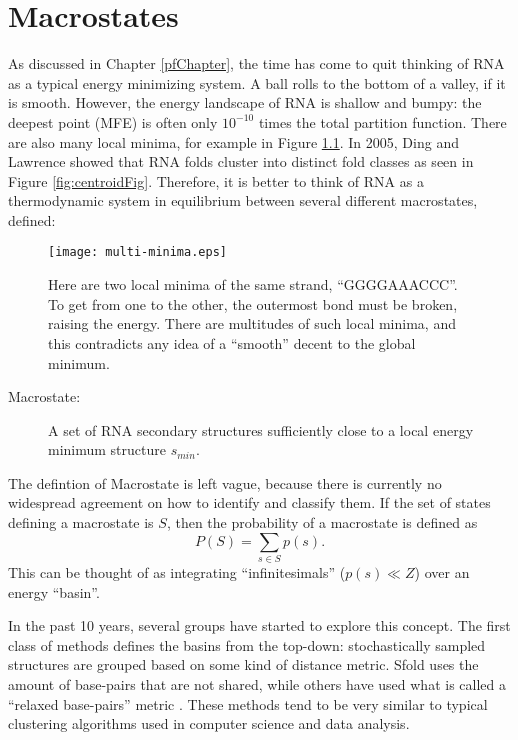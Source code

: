 \chapter{Macrostates}

As discussed in Chapter \ref{pfChapter}, the time has come to quit
thinking of RNA as a typical energy minimizing system. A ball rolls to
the bottom of a valley, if it is smooth. However, the energy landscape
of RNA is shallow and bumpy: the deepest point (MFE) is often only
$10^{-10}$ times the total partition function. There are also many
local minima, for example in Figure \ref{fig:localMinima}. In 2005,
Ding and Lawrence showed that RNA folds cluster into distinct fold
classes \cite{ding2005rna} as seen in Figure
\ref{fig:centroidFig}. Therefore, it is better to think of RNA as a
thermodynamic system in equilibrium between several different
macrostates, defined:
\begin{figure}[t]
\texttt{[image: multi-minima.eps]}
\caption[Local Minima]{Here are two local minima of the same strand,
  ``GGGGAAACCC''. To get from one to the other, the outermost bond
  must be broken, raising the energy. There are multitudes of such
  local minima, and this contradicts any idea of a ``smooth'' decent
  to the global minimum.}
\label{fig:localMinima}
\end{figure}
\begin{description}
\item[Macrostate:] A set of RNA secondary structures sufficiently close to a local energy minimum structure $s_{min}$.
\end{description}
The defintion of Macrostate is left vague, because there is currently
no widespread agreement on how to identify and classify them. If the
set of states defining a macrostate is $S$, then the probability of a
macrostate is defined as
\begin{equation} 
P(S) = \sum_{s \in S} p(s).
\end{equation}
This can be thought of as integrating ``infinitesimals'' ($p(s)\ll Z$)
over an energy ``basin''.

In the past 10 years, several groups have started to explore this
concept. The first class of methods defines the basins from the
top-down: stochastically sampled structures are grouped based on some
kind of distance metric. Sfold uses the amount of base-pairs that are
not shared, while others have used what is called a ``relaxed
base-pairs'' metric \cite{ding2005rna}
\cite{agius2010comparing}. These methods tend to be very similar to
typical clustering algorithms used in computer science and data
analysis.

